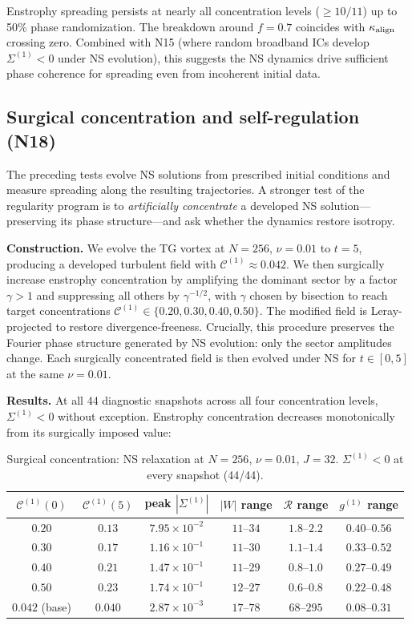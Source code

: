 \documentclass[11pt]{article}
\theoremstyle{definition}
\newcommand{\cC}{\mathcal{C}}
\begin{document}
Enstrophy spreading persists at nearly all
concentration levels ($\geq 10/11$) up to 50\%
phase randomization.  The breakdown around $f=0.7$
coincides with $\kappa_{\rm align}$ crossing zero.
Combined with N15 (where random broadband ICs develop
$\Sigma^{(1)}<0$ under NS evolution), this suggests
the NS dynamics drive sufficient phase coherence
for spreading even from incoherent initial data.


\subsection{Surgical concentration and self-regulation (N18)}
\label{sec:surgical}

The preceding tests evolve NS solutions from prescribed
initial conditions and measure spreading along the
resulting trajectories.  A stronger test of the
regularity program is to \emph{artificially concentrate}
a developed NS solution---preserving its phase
structure---and ask whether the dynamics restore
isotropy.

\medskip\noindent\textbf{Construction.}
We evolve the TG vortex at $N=256$, $\nu=0.01$ to
$t=5$, producing a developed turbulent field with
$\cC^{(1)}\approx 0.042$.  We then surgically
increase enstrophy concentration by amplifying the
dominant sector by a factor $\gamma>1$ and suppressing
all others by $\gamma^{-1/2}$, with $\gamma$ chosen
by bisection to reach target concentrations
$\cC^{(1)}\in\{0.20, 0.30, 0.40, 0.50\}$.  The
modified field is Leray-projected to restore
divergence-freeness.  Crucially, this procedure
preserves the Fourier phase structure generated by
NS evolution: only the sector amplitudes change.
Each surgically concentrated field is then evolved
under NS for $t\in[0,5]$ at the same $\nu=0.01$.

\medskip\noindent\textbf{Results.}
At all 44 diagnostic snapshots across all four
concentration levels, $\Sigma^{(1)}<0$ without
exception.  Enstrophy concentration decreases
monotonically from its surgically imposed value:

\begin{table}[h]
\centering
\caption{Surgical concentration: NS relaxation at
$N=256$, $\nu=0.01$, $J=32$.  $\Sigma^{(1)}<0$ at
every snapshot (44/44).}
\label{tab:surgical}
\begin{tabular}{@{}cccccc@{}}
\toprule
$\cC^{(1)}(0)$ & $\cC^{(1)}(5)$
  & peak $|\Sigma^{(1)}|$
  & $|W|$ range
  & $\mathcal{R}$ range
  & $g^{(1)}$ range \\
\midrule
$0.20$ & $0.13$ & $7.95\times 10^{-2}$
  & $11$--$34$ & $1.8$--$2.2$ & $0.40$--$0.56$ \\
$0.30$ & $0.17$ & $1.16\times 10^{-1}$
  & $11$--$30$ & $1.1$--$1.4$ & $0.33$--$0.52$ \\
$0.40$ & $0.21$ & $1.47\times 10^{-1}$
  & $11$--$29$ & $0.8$--$1.0$ & $0.27$--$0.49$ \\
$0.50$ & $0.23$ & $1.74\times 10^{-1}$
  & $12$--$27$ & $0.6$--$0.8$ & $0.22$--$0.48$ \\
\midrule
$0.042$ (base) & $0.040$ & $2.87\times 10^{-3}$
  & $17$--$78$ & $68$--$295$ & $0.08$--$0.31$ \\
\bottomrule
\end{tabular}
\end{table}
\end{document}
